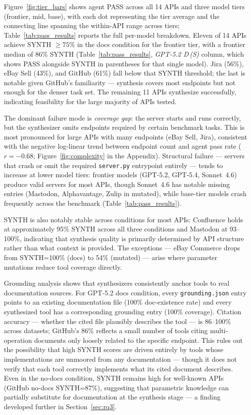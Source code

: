 Figure~\ref{fig:tier_bars} shows agent PASS across all 14 APIs and three model tiers (frontier, mid, base), with each dot representing the tier average and the connecting line spanning the within-API range across tiers; Table~\ref{tab:pass_results} reports the full per-model breakdown. Eleven of 14 APIs achieve SYNTH $\geq 75\%$ in the docs condition for the frontier tier, with a frontier median of 86\% SYNTH (Table~\ref{tab:pass_results}, \textit{GPT-5.2 D\,(S)} column, which shows PASS alongside SYNTH in parentheses for that single model). Jira (56\%), eBay Sell (43\%), and GitHub (61\%) fall below that SYNTH threshold; the last is notable given GitHub's familiarity --- synthesis covers most endpoints but not enough for the denser task set. The remaining 11 APIs synthesize successfully, indicating feasibility for the large majority of APIs tested.

The dominant failure mode is \emph{coverage gap}: the server starts and runs correctly, but the synthesizer omits endpoints required by certain benchmark tasks. This is most pronounced for large APIs with many endpoints (eBay Sell, Jira), consistent with the negative log-linear trend between endpoint count and agent pass rate ($r = -0.68$; Figure~\ref{fig:complexity} in the Appendix). Structural failure --- servers that crash or omit the required \texttt{server.py} entrypoint entirely --- tends to increase at lower model tiers: frontier models (GPT-5.2, GPT-5.4, Sonnet~4.6) produce valid servers for most APIs, though Sonnet~4.6 has notable missing entries (Mastodon, Alphavantage, Zulip in mutated), while base-tier models crash frequently across the benchmark (Table~\ref{tab:pass_results}).

SYNTH is also notably stable across conditions for most APIs: Confluence holds at approximately 95\% SYNTH across all three conditions and Mastodon at 93--100\%, indicating that synthesis quality is primarily determined by API structure rather than what context is provided. The exceptions --- eBay Commerce drops from SYNTH=100\% (docs) to 54\% (mutated) --- arise where parameter mutations reduce tool coverage directly.

Grounding analysis shows that synthesizers consistently anchor tools to real documentation sources. For GPT-5.2 docs condition, every \texttt{grounding.json} entry points to an existing documentation file (100\% doc-existence rate) and every synthesized tool has a corresponding grounding entry (100\% coverage). Citation accuracy --- whether the cited
file plausibly describes the tool --- is 86--100\% across datasets; GitHub's 86\% reflects a small number of tools citing multi-operation documents only loosely related to the specific endpoint. This rules out the possibility that high SYNTH scores are driven entirely by tools whose implementations are unmoored from any documentation --- though it does not verify that each tool correctly implements what its cited document describes. Even in the no-docs condition, SYNTH remains high for well-known APIs (GitHub no-docs SYNTH=87\%), suggesting that parametric knowledge can partially substitute for documentation at the synthesis stage --- a finding developed further in Section~\ref{sec:rq3}.

